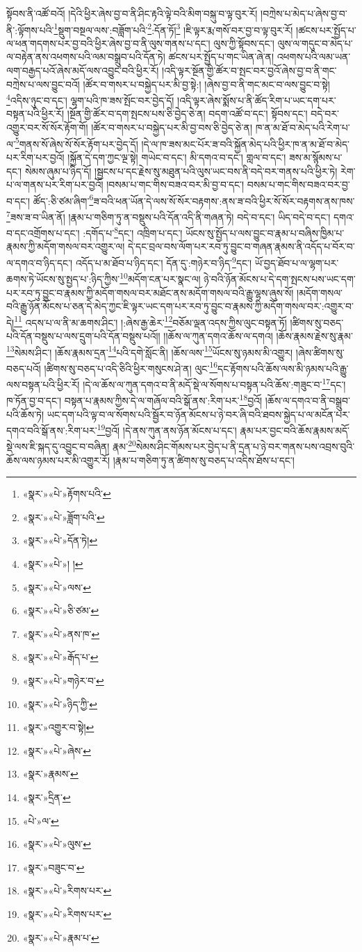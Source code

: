 སྟོབས་ནི་འཚོ་བའོ། །དེའི་ཕྱིར་ཞེས་བྱ་བ་ནི་ཤིང་རྟའི་ལྟེ་བའི་མིག་བསྐུ་བ་ལྟ་བུར་རོ། །བཀྲེས་པ་མེད་པ་ཞེས་བྱ་བ་ནི་:ལྟོགས་པའི་\footnote{«སྣར་»«པེ་»རྟོགས་པའི་}སྡུག་བསྔལ་ལས་:བཟློག་པའི་\footnote{«སྣར་»«པེ་»ཟློག་པའི་}:དོན་ཏོ།\footnote{«སྣར་»«པེ་»དོན་ཏེ།} །ཇི་ལྟར་རྨ་གསོ་བར་བྱ་བ་ལྟ་བུར་རོ། །ཚངས་པར་སྤྱོད་པ་ལ་ཕན་གདགས་པར་བྱ་བའི་ཕྱིར་ཞེས་བྱ་བ་ནི་ལུས་གནས་པ་དང་། ལུས་ཀྱི་སྟོབས་དང་། ལུས་ལ་གདུང་བ་མེད་པ་ལ་བརྟེན་ནས་འཕགས་པའི་ལམ་བསྒྲུབ་པའི་དོན་ཏེ། ཚངས་པར་སྤྱོད་པ་གང་ཡིན་ཞེ་ན། འཕགས་པའི་ལམ་ཡན་ལག་བརྒྱད་པའོ་ཞེས་མདོ་ལས་འབྱུང་བའི་ཕྱིར་རོ། །འདི་ལྟར་སྔོན་གྱི་ཚོར་བ་སྤང་བར་བྱའོ་ཞེས་བྱ་བ་ནི་གང་བཀྲེས་པ་ལས་བྱུང་བའོ། །ཚོར་བ་གསར་པ་བསྐྱེད་པར་མི་བྱ་སྟེ:། །ཞེས་བྱ་བ་ནི་གང་མང་བ་ལས་བྱུང་བ་སྟེ། \footnote{«སྣར་»«པེ་»། ། }འདིས་ཉུང་བ་དང་། ལྷག་པའི་ཁ་ཟས་སྤོང་བར་བྱེད་དོ། །འདི་ལྟར་ཞེས་སྨོས་པ་ནི་ཚོད་རིག་པ་ཡང་དག་པར་བསྟན་པའི་ཕྱིར་རོ། །སྔོན་གྱི་ཚོར་བ་དག་སྤངས་པས་ཅི་བྱེད་ཅེ་ན། བདག་འཚོ་བ་དང་། སྟོབས་དང་། བདེ་བར་འགྱུར་བར་སོ་སོར་རྟོག་གོ། །ཚོར་བ་གསར་པ་བསྐྱེད་པར་མི་བྱ་བས་ཅི་བྱེད་ཅེ་ན། ཁ་ན་མ་ཐོ་བ་མེད་པའི་རེག་པ་ལ་\footnote{«སྣར་»«པེ་»ལས་}གནས་སོ་ཞེས་སོ་སོར་རྟོག་པར་བྱེད་དོ། །དེ་ལ་ཁ་ཟས་མང་པོར་ཟ་བའི་སྐྱོན་མེད་པའི་ཕྱིར་ཁ་ན་མ་ཐོ་བ་མེད་པར་རིག་པར་བྱའོ། །སྐྱོན་དེ་དག་ཀྱང་ལྔ་སྟེ། གཡེང་བ་དང་། མི་དགའ་བ་དང་། གླལ་བ་དང་། ཟས་མ་སྙོམས་པ་དང་། སེམས་ཞུམ་པ་ཉིད་དོ། །སྦྱངས་པ་དང་རྗེས་སུ་མཐུན་པའི་ལུས་ཡང་བས་ནི་བདེ་བར་གནས་པའི་ཕྱིར་ཏེ། རེག་པ་ལ་གནས་པར་རིག་པར་བྱའོ། །བསམ་པ་གང་གིས་བཟའ་བར་མི་བྱ་བ་དང་། བསམ་པ་གང་གིས་བཟའ་བར་བྱ་བ་དང་། ཚོད་:ཅི་ཙམ་ཞིག་\footnote{«སྣར་»«པེ་»ཅི་ཙམ་}ཟ་བའི་ཕན་ཡོན་དེ་ལས་སོ་སོར་བརྟགས་:ནས་ཟ་བའི་ཕྱིར་སོ་སོར་བརྟགས་ནས་ཁས་\footnote{«སྣར་»«པེ་»ནས་ཁ་}ཟས་ཟ་བ་ཡིན་ནོ། །རྣམ་པ་གཅིག་ཏུ་ན་བསྡུས་པའི་དོན་འདི་ནི་གཞན་ཏེ། བདེ་བ་དང་། ཡིད་བདེ་བ་དང་། དགའ་བ་དང་འགྲོགས་པ་དང་། :དགོད་པ་\footnote{«སྣར་»«པེ་»རྒོད་པ་}དང་། འཁྲིག་པ་དང་། ཡོངས་སུ་སྤྱོད་པ་ལས་བྱུང་བ་རྣམ་པ་བཞིས་ཁྱིམ་པ་རྣམས་ཀྱི་མདོག་གསལ་བར་འགྱུར་ལ། དེ་དང་བྲལ་བས་ལོག་པར་རབ་ཏུ་བྱུང་བ་གཞན་རྣམས་ནི་འདོད་པ་བོར་བ་ལ་དགའ་བ་ཉིད་དང་། འདོད་པ་མ་ཐོབ་པ་ཉིད་དང་། དོན་དུ་:གཉེར་བ་ཉིད་\footnote{«སྣར་»«པེ་»གཉེར་བ་}དང་། ཡོ་བྱད་ཐོབ་པ་ལ་ལྷག་པར་ཆགས་ཏེ་ཡོངས་སུ་སྤྱད་པ་:ཉིད་ཀྱིས་\footnote{«སྣར་»«པེ་»ཉིད་ཀྱི་}མདོག་ངན་པར་སྣང་ལ། ཉེ་བའི་ཉོན་མོངས་པ་དེ་དག་སྤངས་པས་ཡང་དག་པར་རབ་ཏུ་བྱུང་བ་རྣམས་ཀྱི་མདོག་གསལ་བར་མཐོང་ནས་མདོག་གསལ་བའི་རྒྱུ་ལྷས་ཞུས་སོ། །མདོག་གསལ་བའི་རྒྱུ་ཉོན་མོངས་པ་ཅན་དེ་མེད་ཀྱང་ཇི་ལྟར་ཡང་དག་པར་རབ་ཏུ་བྱུང་བ་རྣམས་ཀྱི་མདོག་གསལ་བར་:འགྱུར་བ་དེ།\footnote{«སྣར་»འགྱུར་བ་སྟེ།} འདས་པ་ལ་ནི་མ་ཆགས་ཤིང་། །:ཞེས་རྒྱ་ཆེར་\footnote{«སྣར་»«པེ་»ཞེས་}བཅོམ་ལྡན་འདས་ཀྱིས་ལུང་བསྟན་ཏོ། །ཚིགས་སུ་བཅད་པའི་དོན་བསྡུས་པ་ལས་དྲུག་པའི་དོན་བསྡུས་པའོ།། །།ཆོས་ལ་ཀུན་དགའ་ཆོས་ལ་དགའ། །ཆོས་རྣམས་རྗེས་སུ་རྣམ་\footnote{«སྣར་»རྣམས་}སེམས་ཤིང་། །ཆོས་རྣམས་དྲན་\footnote{«སྣར་»དྲིན་}པའི་དགེ་སློང་ནི། །ཆོས་ལས་\footnote{«པེ་»ལ་}ཡོངས་སུ་ཉམས་མི་འགྱུར། །ཞེས་ཚིགས་སུ་བཅད་པའོ། །ཚིགས་སུ་བཅད་པ་འདི་ཅིའི་ཕྱིར་གསུངས་ཤེ་ན། ལུང་\footnote{«སྣར་»«པེ་»ལུས་}དང་རྟོགས་པའི་ཆོས་ལས་མི་ཉམས་པའི་རྒྱུ་ལས་བསྟན་པའི་ཕྱིར་རོ། །དེ་ལ་ཆོས་ལ་ཀུན་དགའ་བ་ནི་མདོ་སྡེ་ལ་སོགས་པ་བསྟན་པའི་ཆོས་:གཟུང་བ་\footnote{«སྣར་»བཟུང་བ་}དང་། ཁ་ཏོན་བྱ་བ་དང་། བསྟན་པ་རྣམས་ཀྱིས་དེ་ལ་གཞོལ་བའི་སྒོ་ནས་:རིག་པར་\footnote{«སྣར་»«པེ་»རིགས་པར་}བྱའོ། །ཆོས་ལ་དགའ་བ་ནི་བསྒྲུབ་པའི་ཆོས་ཏེ། ཡང་དག་པའི་ལྟ་བ་ལ་སོགས་པའི་སྦྱོར་བ་ཉོན་མོངས་པ་ཉེ་བར་ཞི་བའི་ཐབས་སྐྱེད་པ་ལ་མངོན་པར་དགའ་བའི་སྒོ་ནས་:རིག་པར་\footnote{«སྣར་»«པེ་»རིགས་པར་}བྱའོ། །དེ་ནས་ཀུན་ནས་ཉོན་མོངས་པ་དང་། རྣམ་པར་བྱང་བའི་ཆོས་རྣམས་མདོ་སྡེ་ལས་ཇི་སྐད་དུ་འབྱུང་བ་བཞིན། རྣམ་\footnote{«སྣར་»«པེ་»རྣམ་པ་}སེམས་ཤིང་གོམས་པར་བྱེད་པ་ནི་དྲན་པ་ཉེ་བར་གནས་པས་འབྲས་བུའི་ཆོས་ལས་ཉམས་པར་མི་འགྱུར་རོ། །རྣམ་པ་གཅིག་ཏུ་ན་ཚིགས་སུ་བཅད་པ་འདིས་ཐོས་པ་དང་། 